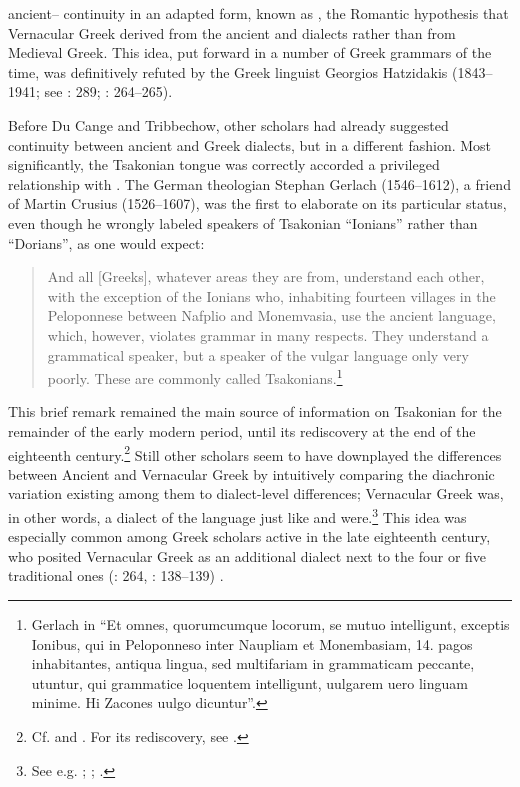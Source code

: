 ancient– continuity in an adapted form, known as , the Romantic hypothesis that Vernacular Greek derived from the ancient  and  dialects rather than from Medieval Greek. This idea, put forward in a number of Greek grammars of the time, was definitively refuted by the Greek linguist Georgios Hatzidakis (1843–1941; see \citealt{Argyropoulos2009}: 289; \citealt{Mackridge2009}: 264–265).

Before Du Cange and Tribbechow, other scholars had already suggested continuity between ancient and  Greek dialects, but in a different fashion. Most significantly, the Tsakonian tongue was correctly accorded a privileged relationship with . The German theologian Stephan Gerlach (1546–1612), a friend of Martin Crusius (1526–1607), was the first to elaborate on its particular status, even though he wrongly labeled speakers of Tsakonian “Ionians” rather than “Dorians”, as one would expect:

\begin{quote}
And all [Greeks], whatever areas they are from, understand each other, with the exception of the Ionians who, inhabiting fourteen villages in the Peloponnese between Nafplio and Monemvasia, use the ancient language, which, however, violates grammar in many respects. They understand a grammatical speaker, but a speaker of the vulgar language only very poorly. These are commonly called Tsakonians.\footnote{Gerlach in \citet[489]{Crusius1584} “Et omnes, quorumcumque locorum, se mutuo intelligunt, exceptis Ionibus, qui in Peloponneso inter Naupliam et Monembasiam, 14. pagos inhabitantes, antiqua lingua, sed multifariam in grammaticam peccante, utuntur, qui grammatice loquentem intelligunt, uulgarem uero linguam minime. Hi Zacones uulgo dicuntur”.}
\end{quote}

This brief remark remained the main source of information on Tsakonian for the remainder of the early modern period, until its rediscovery at the end of the eighteenth century.\footnote{Cf. \citet[44]{Howell1650a} and \citet[vii]{Du1688}. For its rediscovery, see \citet{Famerie2007}.} Still other scholars seem to have downplayed the differences between Ancient and Vernacular Greek by intuitively comparing the diachronic variation existing among them to dialect-level differences; Vernacular Greek was, in other words, a dialect of the language just like  and  were.\footnote{See e.g. \citet[47--48]{Castillo1678}; \citet[\textsc{i.}184, 4th sequence of pagination]{Chambers1728}; \citet[127--128]{Freret1809}.} This idea was especially common among Greek scholars active in the late eighteenth century, who posited Vernacular Greek as an additional dialect next to the four or five traditional ones (\citealt{Mackridge2009}: 264, \citealt{Mackridge2014}: 138--139) .

